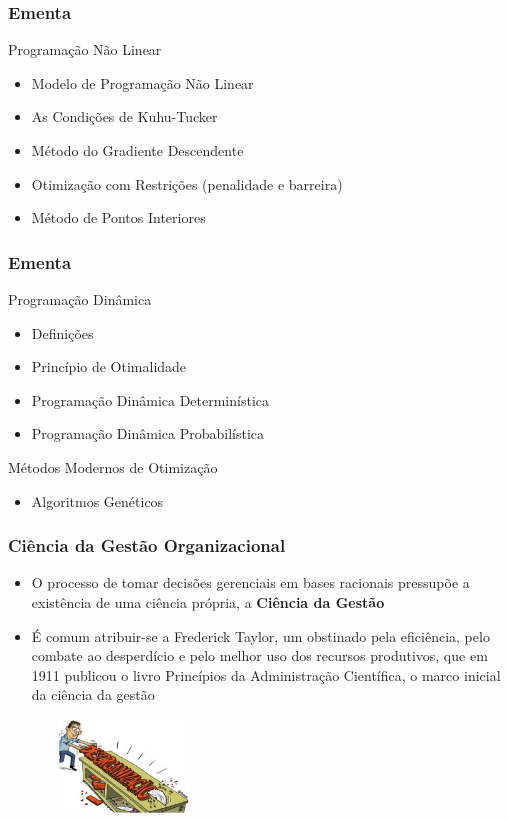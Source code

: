 \documentclass{beamer}
\begin{document}
\begin{frame}
	\frametitle{Ementa}
	\begin{block}{Programação Não Linear}
		\begin{itemize}
			\item Modelo de Programação Não Linear
			\item As Condições de Kuhu-Tucker
			\item Método do Gradiente Descendente
			\item Otimização com Restrições (penalidade e barreira)
			\item Método de Pontos Interiores
		\end{itemize}
	\end{block}
\end{frame}

\begin{frame}
	\frametitle{Ementa}
	\begin{block}{Programação Dinâmica}
		\begin{itemize}
			\item Definições
			\item Princípio de Otimalidade
			\item Programação Dinâmica Determinística
			\item Programação Dinâmica Probabilística
		\end{itemize}
	\end{block}
	\begin{block}{Métodos Modernos de Otimização}
		\begin{itemize}
			\item Algoritmos Genéticos
		\end{itemize}
	\end{block}
\end{frame}

\begin{frame}
	\frametitle{Ciência da Gestão Organizacional}
	\begin{itemize}
		\item O processo de tomar decisões gerenciais em bases racionais pressupõe a existência de uma ciência própria, a \textbf{\color{red}Ciência da Gestão}
		\item É comum atribuir-se a Frederick Taylor, um obstinado pela eficiência, pelo combate ao desperdício e pelo melhor uso dos recursos produtivos, que em 1911 publicou o livro Princípios da Administração Científica, o marco inicial da ciência da gestão
	\end{itemize}
	\begin{figure}
		\includegraphics[width=4cm,height=2.5cm]{desorganizacao.png}
	\end{figure}
\end{frame}
\end{document}

